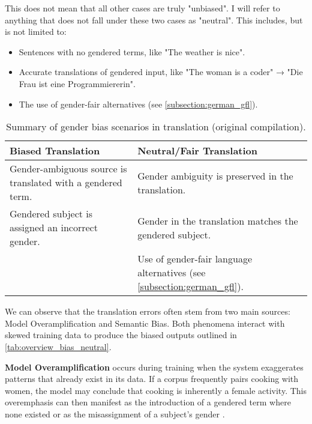     This does not mean that all other cases are truly "unbiased". I will refer to anything that does not fall under these two cases as "neutral". This includes, but is not limited to:

        \begin{itemize}
        \item Sentences with no gendered terms, like "The weather is nice".
        \item Accurate translations of gendered input, like "The woman is a coder" → "Die Frau ist eine Programmiererin".
        \item The use of gender-fair alternatives (see \autoref{subsection:german_gfl}).
        \end{itemize}

    \begin{table}[htb]
    \centering
    \begin{tabularx}{\linewidth}{X | X}
        \toprule
        \textbf{Biased Translation} & \textbf{Neutral/Fair Translation} \\
        \midrule
        Gender-ambiguous source is translated with a gendered term. & 
        Gender ambiguity is preserved in the translation. \\
        \addlinespace[0.5em]
        Gendered subject is assigned an incorrect gender. & 
        Gender in the translation matches the gendered subject. \\
        \addlinespace[0.5em]
        \multicolumn{1}{c|}{—} & 
        Use of gender-fair language alternatives (see \autoref{subsection:german_gfl}). \\
        \bottomrule
    \end{tabularx}
    \caption{Summary of gender bias scenarios in translation (original compilation).}
    \label{tab:overview_bias_neutral}
    \end{table}

    We can observe that the translation errors often stem from two main sources: Model Overamplification and Semantic Bias. Both phenomena interact with skewed training data to produce the biased outputs outlined in \autoref{tab:overview_bias_neutral}.

    \textbf{Model Overamplification} occurs during training when the system exaggerates patterns that already exist in its data. If a corpus frequently pairs cooking with women, the model may conclude that cooking is inherently a female activity. This overemphasis can then manifest as the introduction of a gendered term where none existed or as the misassignment of a subject’s gender \citep{ullmannGenderBiasMachine2022,shahPredictiveBiasesNatural2020}.

